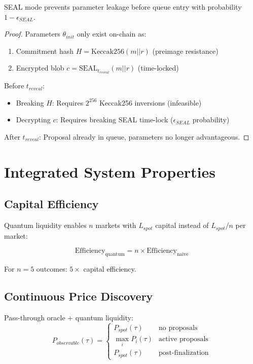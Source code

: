 \documentclass{article}
\begin{document}
\begin{theorem}
SEAL mode prevents parameter leakage before queue entry with probability $1 - \epsilon_{SEAL}$.
\end{theorem}

\begin{proof}
Parameters $\theta_{init}$ only exist on-chain as:
\begin{enumerate}
\item Commitment hash $H = \text{Keccak256}(m || r)$ (preimage resistance)
\item Encrypted blob $c = \text{SEAL}_{t_{reveal}}(m || r)$ (time-locked)
\end{enumerate}

Before $t_{reveal}$:
\begin{itemize}
\item Breaking $H$: Requires $2^{256}$ Keccak256 inversions (infeasible)
\item Decrypting $c$: Requires breaking SEAL time-lock ($\epsilon_{SEAL}$ probability)
\end{itemize}

After $t_{reveal}$: Proposal already in queue, parameters no longer advantageous.
\end{proof}

\section{Integrated System Properties}

\subsection{Capital Efficiency}

Quantum liquidity enables $n$ markets with $L_{spot}$ capital instead of $L_{spot}/n$ per market:

$$\text{Efficiency}_{\text{quantum}} = n \times \text{Efficiency}_{\text{naive}}$$

For $n = 5$ outcomes: $5\times$ capital efficiency.

\subsection{Continuous Price Discovery}

Pass-through oracle + quantum liquidity:
$$P_{observable}(\tau) = \begin{cases}
P_{spot}(\tau) & \text{no proposals} \\
\max_i P_i(\tau) & \text{active proposals} \\
P_{spot}(\tau) & \text{post-finalization}
\end{cases}$$
\end{document}
